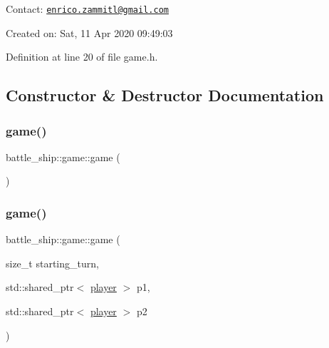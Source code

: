 Contact\+: \href{mailto:enrico.zammitl@gmail.com}{\tt enrico.\+zammitl@gmail.\+com}

Created on\+: Sat, 11 Apr 2020 09\+:49\+:03 

Definition at line 20 of file game.\+h.



\subsection{Constructor \& Destructor Documentation}
\mbox{\label{classbattle__ship_1_1game_a3a98cd01dec3c29d91d057049c421c89}} 
\subsubsection{\texorpdfstring{game()}{game()}\hspace{0.1cm}{\footnotesize\ttfamily [1/2]}}
{\footnotesize\ttfamily battle\+\_\+ship\+::game\+::game (\begin{DoxyParamCaption}{ }\end{DoxyParamCaption})\hspace{0.3cm}{\ttfamily [default]}}

\mbox{\label{classbattle__ship_1_1game_a932962ce40fffb1c8008a353971afa4c}} 
\subsubsection{\texorpdfstring{game()}{game()}\hspace{0.1cm}{\footnotesize\ttfamily [2/2]}}
{\footnotesize\ttfamily battle\+\_\+ship\+::game\+::game (\begin{DoxyParamCaption}\item[{size\+\_\+t}]{starting\+\_\+turn,  }\item[{std\+::shared\+\_\+ptr$<$ \hyperlink{classbattle__ship_1_1player}{player} $>$}]{p1,  }\item[{std\+::shared\+\_\+ptr$<$ \hyperlink{classbattle__ship_1_1player}{player} $>$}]{p2 }\end{DoxyParamCaption})\hspace{0.3cm}{\ttfamily [inline]}}



